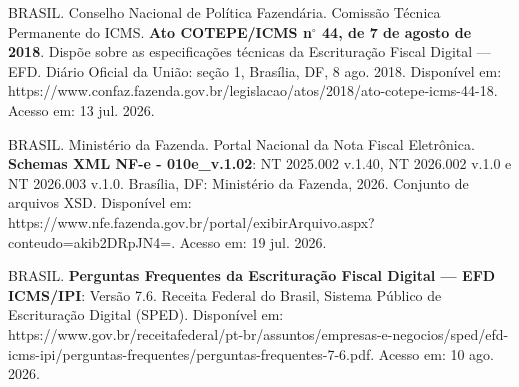  BRASIL. Conselho Nacional de Política Fazendária. Comissão Técnica Permanente do ICMS. \textbf{Ato COTEPE/ICMS n\(^\circ\) 44, de 7 de agosto de 2018}. Dispõe sobre as especificações técnicas da Escrituração Fiscal Digital --- EFD. Diário Oficial da União: seção 1, Brasília, DF, 8 ago. 2018. Disponível em: https://www.confaz.fazenda.gov.br/legislacao/atos/2018/ato-cotepe-icms-44-18. Acesso em: 13 jul. 2026.

 BRASIL. Ministério da Fazenda. Portal Nacional da Nota Fiscal Eletrônica. \textbf{Schemas XML NF-e - 010e\_v.1.02}: NT 2025.002 v.1.40, NT 2026.002 v.1.0 e NT 2026.003 v.1.0. Brasília, DF: Ministério da Fazenda, 2026. Conjunto de arquivos XSD. Disponível em: https://www.nfe.fazenda.gov.br/portal/exibirArquivo.aspx?conteudo=akib2DRpJN4=. Acesso em: 19 jul. 2026.

 BRASIL. \textbf{Perguntas Frequentes da Escrituração Fiscal Digital --- EFD ICMS/IPI}: Versão 7.6. Receita Federal do Brasil, Sistema Público de Escrituração Digital (SPED). Disponível em: https://www.gov.br/receitafederal/pt-br/assuntos/empresas-e-negocios/sped/efd-icms-ipi/perguntas-frequentes/perguntas-frequentes-7-6.pdf. Acesso em: 10 ago. 2026.